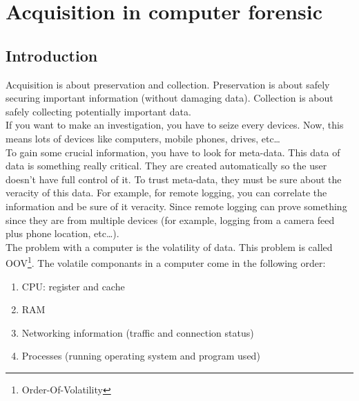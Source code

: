 \section{Acquisition in computer forensic}
\subsection{Introduction}
Acquisition is about preservation and collection. Preservation is about safely securing important information (without damaging data). Collection is about safely collecting potentially important data.\\
If you want to make an investigation, you have to seize every devices. Now, this means lots of devices like computers, mobile phones, drives, etc\ldots\\
To gain some crucial information, you have to look for meta-data. This data of data is something really critical. They are created automatically so the user doesn't have full control of it. To trust meta-data, they must be sure about the veracity of this data. For example, for remote logging, you can correlate the information and be sure of it veracity. Since remote logging can prove something since they are from multiple devices (for example, logging from a camera feed plus phone location, etc\ldots).\\
The problem with a computer is the volatility of data. This problem is called OOV\footnote{Order-Of-Volatility}. The volatile componants in a computer come in the following order:
\begin{enumerate}
	\item CPU: register and cache
	\item RAM
	\item Networking information (traffic and connection status)
	\item Processes (running operating system and program used)
\end{enumerate}
